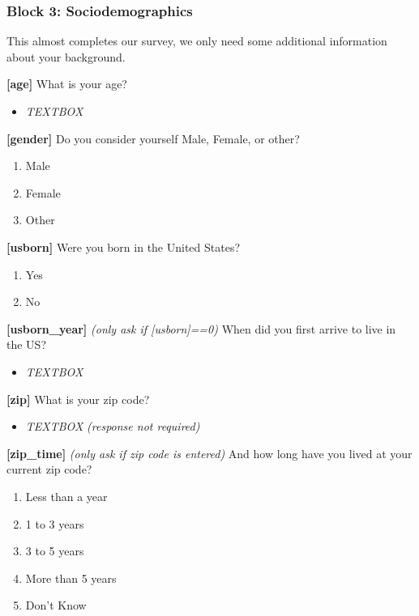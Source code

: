 \documentclass[]{article}
\providecommand{\tightlist}{%
  \setlength{\itemsep}{0pt}\setlength{\parskip}{0pt}}
\begin{document}
\hypertarget{block-3-sociodemographics}{%
\subsubsection{Block 3:
Sociodemographics}\label{block-3-sociodemographics}}

This almost completes our survey, we only need some additional
information about your background.

\textbf{{[}age{]}} What is your age?

\begin{itemize}
\tightlist
\item
  \emph{TEXTBOX}
\end{itemize}

\textbf{{[}gender{]}} Do you consider yourself Male, Female, or other?

\begin{enumerate}
\def\labelenumi{\arabic{enumi}.}
\tightlist
\item
  Male
\item
  Female
\item
  Other
\end{enumerate}

\textbf{{[}usborn{]}} Were you born in the United States?

\begin{enumerate}
\def\labelenumi{\arabic{enumi}.}
\tightlist
\item
  Yes
\item
  No
\end{enumerate}

\textbf{{[}usborn\_year{]}} \emph{(only ask if {[}usborn{]}==0)} When
did you first arrive to live in the US?

\begin{itemize}
\tightlist
\item
  \emph{TEXTBOX}
\end{itemize}

\textbf{{[}zip{]}} What is your zip code?

\begin{itemize}
\tightlist
\item
  \emph{TEXTBOX} \emph{(response not required)}
\end{itemize}

\textbf{{[}zip\_time{]}} \emph{(only ask if zip code is entered)} And
how long have you lived at your current zip code?

\begin{enumerate}
\def\labelenumi{\arabic{enumi}.}
\tightlist
\item
  Less than a year
\item
  1 to 3 years
\item
  3 to 5 years
\item
  More than 5 years
\item
  Don't Know
\end{enumerate}
\end{document}
